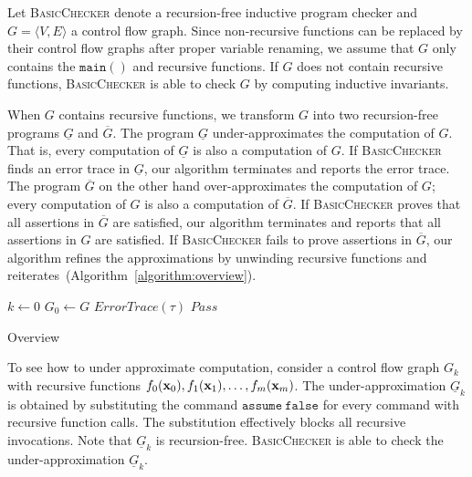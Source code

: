 
Let \textsc{BasicChecker} denote a recursion-free inductive program
checker and $G = \langle V, E \rangle$ a control flow graph. Since
non-recursive functions can be replaced by their control flow graphs
after proper variable renaming, we assume that $G$ only contains the
$\mathtt{main()}$ and recursive functions. If $G$ does not contain
recursive functions, \textsc{BasicChecker} is able to check $G$ by
computing inductive invariants.

When $G$ contains recursive functions, we transform $G$ into two
recursion-free programs $\underline{G}$ and $\overline{G}$. The
program $\underline{G}$ under-approximates the computation of
$G$. That is, every computation of $\underline{G}$ is also a
computation of $G$. If \textsc{BasicChecker} finds an error trace in
$\underline{G}$, our algorithm terminates and reports the error
trace. The program $\overline{G}$ on the other hand over-approximates
the computation of $G$; every computation of $G$ is also a computation
of $\overline{G}$. If \textsc{BasicChecker} proves that all assertions
in $\overline{G}$ are satisfied, our algorithm terminates and reports
that all assertions in $G$ are satisfied. If \textsc{BasicChecker}
fails to prove assertions in $\overline{G}$, our algorithm refines the
approximations by unwinding recursive functions and
reiterates~(Algorithm~\ref{algorithm:overview}). 

\begin{algorithm}
  $k \leftarrow 0$\;
  $G_0 \leftarrow G$\;
  {
    {
      \Return $\mathit{ErrorTrace} (\tau)$\;
    }
    {
      \Return $\mathit{Pass}$\;
    }
  }
  \caption{Overview}
  \label{algorithm:overview}
\end{algorithm}

To see how to under approximate computation, consider a control flow
graph $G_k$ with recursive functions $f_0 (\textbf{x}_0), f_1 (\textbf{x}_1),
\ldots, f_m (\textbf{x}_m)$. The under-approximation $\underline{G}_k$ is
obtained by substituting the command $\mathtt{assume\ false}$ for
every command with recursive function calls. The substitution
effectively blocks all recursive invocations. Note that
$\underline{G}_k$ is recursion-free. \textsc{BasicChecker} is able to
check the under-approximation $\underline{G}_k$.

